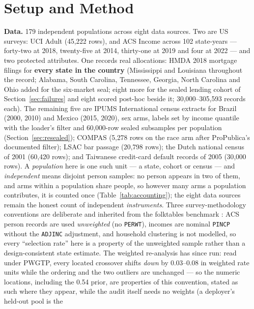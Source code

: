 \documentclass[conference]{IEEEtran}
\begin{document}
\section{Setup and Method}
\label{sec:setup}

\textbf{Data.} 179 independent populations across eight data sources.
Two are US surveys: UCI Adult (45{,}222 rows), and ACS Income \cite{ding2021} across
102 state-years --- forty-two at 2018, twenty-five at 2014, thirty-one at 2019 and four at
2022 --- and two protected attributes. One records real allocations: HMDA 2018 mortgage
filings for \textbf{every state in the country} (Mississippi and Louisiana throughout the record; Alabama,
South Carolina, Tennessee, Georgia, North Carolina and Ohio added for the six-market seal;
eight more for the sealed lending cohort of Section~\ref{sec:failures} and eight scored
post-hoc beside it; 30{,}000--305{,}593 records each). The remaining five are
IPUMS International census extracts for Brazil (2000, 2010) and Mexico (2015, 2020), sex
arms, labels set by income quantile with the loader's filter and 60{,}000-row sealed
subsamples per population (Section~\ref{sec:resealed}); COMPAS \cite{propublica2016}
(5{,}278 rows on the race arm after ProPublica's documented filter); LSAC bar passage
(20{,}798 rows); the Dutch national census of 2001 (60{,}420 rows); and Taiwanese
credit-card default records of 2005 (30{,}000 rows). A
\emph{population} here is one such unit --- a state, cohort or census --- and
\emph{independent} means disjoint person samples: no person appears in two of them, and
arms within a population share people, so however many arms a population contributes, it
is counted once (Table~\ref{tab:accounting}); the eight data sources remain the honest
count of independent \emph{instruments}. Three survey-methodology conventions are
deliberate and inherited from the folktables benchmark \cite{ding2021}: ACS person records
are used \emph{unweighted} (no \texttt{PERWT}), incomes are nominal \texttt{PINCP} without
the \texttt{ADJINC} adjustment, and household clustering is not modelled, so every
``selection rate'' here is a property of the unweighted sample rather than a
design-consistent state estimate. The weighted re-analysis has since run: read under
PWGTP, every located crossover shifts \emph{down} by 0.03--0.08 in weighted rate units
while the ordering and the two outliers are unchanged --- so the numeric locations,
including the 0.54 prior, are properties of this convention, stated as such where they
appear, while the audit itself needs no weights (a deployer's held-out pool is the
\end{document}
